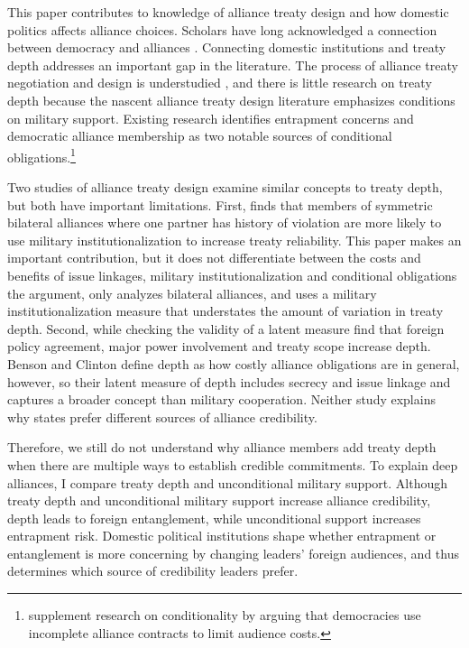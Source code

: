 \documentclass[12pt]{article}
\begin{document}
This paper contributes to knowledge of alliance treaty design and how domestic politics affects alliance choices.
Scholars have long acknowledged a connection between democracy and alliances \citep{LaiReiter2000, GiblerWolford2006, Mattes2012, Warren2016, McManusYarhi-Milo2017}. 
Connecting domestic institutions and treaty depth addresses an important gap in the literature. 
The process of alliance treaty negotiation and design is understudied \citep{Poast2019a}, and there is little research on treaty depth because the nascent alliance treaty design literature emphasizes conditions on military support.
Existing research identifies entrapment concerns \citep{Kim2011, Benson2012} and democratic alliance membership \citep{Mattes2012, Chibaetal2015} as two notable sources of conditional obligations.\footnote{\citet{FjelstulReiter2019} supplement research on conditionality by arguing that democracies use incomplete alliance contracts to limit audience costs.} 


Two studies of alliance treaty design examine similar concepts to treaty depth, but both have important limitations.   
First, \citet{Mattes2012} finds that members of symmetric bilateral alliances where one partner has history of violation are more likely to use military institutionalization to increase treaty reliability. 
This paper makes an important contribution, but it does not differentiate between the costs and benefits of issue linkages, military institutionalization and conditional obligations the argument, only analyzes bilateral alliances, and uses a military institutionalization measure \citep{LeedsAnac2005} that understates the amount of variation in treaty depth.  
Second, while checking the validity of a latent measure \citet{BensonClinton2016} find that foreign policy agreement, major power involvement and treaty scope increase depth. 
Benson and Clinton define depth as how costly alliance obligations are in general, however, so their latent measure of depth includes secrecy and issue linkage and captures a broader concept than military cooperation. 
Neither study explains why states prefer different sources of alliance credibility. 


Therefore, we still do not understand why alliance members add treaty depth when there are multiple ways to establish credible commitments. 
To explain deep alliances, I compare treaty depth and unconditional military support.  
Although treaty depth and unconditional military support increase alliance credibility, depth leads to foreign entanglement, while unconditional support increases entrapment risk. 
Domestic political institutions shape whether entrapment or entanglement is more concerning by changing leaders' foreign audiences, and thus determines which source of credibility leaders prefer. 
\end{document}
